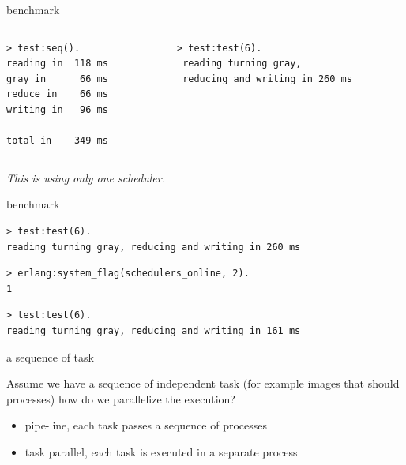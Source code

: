 \begin{frame}[fragile]{benchmark}

\begin{columns}
 \begin{column}{0.5\linewidth}
\begin{verbatim}
> test:seq().
reading in  118 ms 
gray in      66 ms 
reduce in    66 ms 
writing in   96 ms 

total in    349 ms
\end{verbatim}
 \end{column}
\pause
 \begin{column}{0.5\linewidth}
\begin{verbatim}
> test:test(6).
 reading turning gray, 
 reducing and writing in 260 ms 
\end{verbatim}
 \end{column}
\end{columns}

\pause\vspace{10pt}
{\em This is using only one scheduler.}

\end{frame}

\begin{frame}[fragile]{benchmark}

\begin{verbatim}
> test:test(6).
reading turning gray, reducing and writing in 260 ms 
\end{verbatim}
\pause
\begin{verbatim}
> erlang:system_flag(schedulers_online, 2). 
1
\end{verbatim}
\pause
\begin{verbatim}
> test:test(6).                            
reading turning gray, reducing and writing in 161 ms 
\end{verbatim}

\end{frame}

\begin{frame}{a sequence of task}

  Assume we have a sequence of independent task (for example images
  that should processes) how do we parallelize the execution?

\pause\vspace{10pt}
\begin{itemize}
\pause\item pipe-line, each task passes a sequence of processes 
\pause\item task parallel, each task is executed in a separate process
\end{itemize}

\pause\vspace{20pt}{\em Pros and cons?}

\end{frame}

